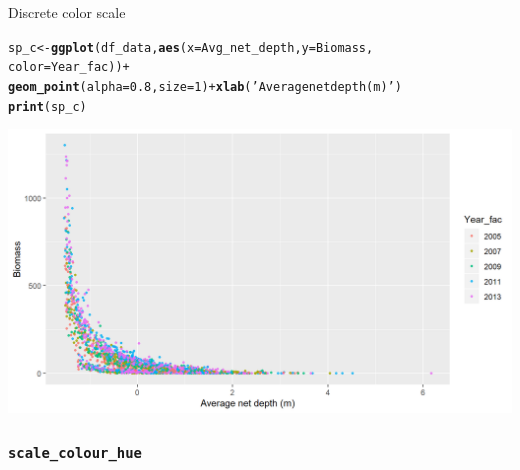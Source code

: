 \documentclass{beamer}\usepackage[]{graphicx}\usepackage[]{color}
\makeatletter
\newcommand{\hlnum}[1]{\textcolor[rgb]{0.686,0.059,0.569}{#1}}%
\newcommand{\hlstr}[1]{\textcolor[rgb]{0.192,0.494,0.8}{#1}}%
\newcommand{\hlopt}[1]{\textcolor[rgb]{0,0,0}{#1}}%
\newcommand{\hlstd}[1]{\textcolor[rgb]{0.345,0.345,0.345}{#1}}%
\newcommand{\hlkwb}[1]{\textcolor[rgb]{0.69,0.353,0.396}{#1}}%
\newcommand{\hlkwc}[1]{\textcolor[rgb]{0.333,0.667,0.333}{#1}}%
\newcommand{\hlkwd}[1]{\textcolor[rgb]{0.737,0.353,0.396}{\textbf{#1}}}%
\newenvironment{kframe}{%
 \def\at@end@of@kframe{}%
 \ifinner\ifhmode%
  \def\at@end@of@kframe{\end{minipage}}%
  \begin{minipage}{\columnwidth}%
 \fi\fi%
 \def\FrameCommand##1{\hskip\@totalleftmargin \hskip-\fboxsep
 \colorbox{shadecolor}{##1}\hskip-\fboxsep
     \hskip-\linewidth \hskip-\@totalleftmargin \hskip\columnwidth}%
 \MakeFramed {\advance\hsize-\width
   \@totalleftmargin\z@ \linewidth\hsize
   \@setminipage}}%
 {\par\unskip\endMakeFramed%
 \at@end@of@kframe}
\newenvironment{knitrout}{}{} %
\makeatother
\begin{document}
\begin{frame}[fragile]{Discrete color scale}
\begin{knitrout}\footnotesize
{}\color{fgcolor}\begin{kframe}
\begin{alltt}
\hlstd{sp_c} \hlkwb{<-} \hlkwd{ggplot}\hlstd{(df_data,} \hlkwd{aes}\hlstd{(}\hlkwc{x}\hlstd{=Avg_net_depth,} \hlkwc{y}\hlstd{=Biomass,}
                            \hlkwc{color}\hlstd{=Year_fac))} \hlopt{+}
  \hlkwd{geom_point}\hlstd{(}\hlkwc{alpha}\hlstd{=}\hlnum{0.8}\hlstd{,} \hlkwc{size}\hlstd{=}\hlnum{1}\hlstd{)} \hlopt{+} \hlkwd{xlab}\hlstd{(}\hlstr{'Average net depth (m)'}\hlstd{)}
\hlkwd{print}\hlstd{(sp_c)}
\end{alltt}
\end{kframe}

{\centering \includegraphics[width=.9\linewidth]{figure/sp_discrete_color1-1} 

}



\end{knitrout}
\end{frame}

\subsubsection{\lstinline{scale_colour_hue}}
\end{document}
